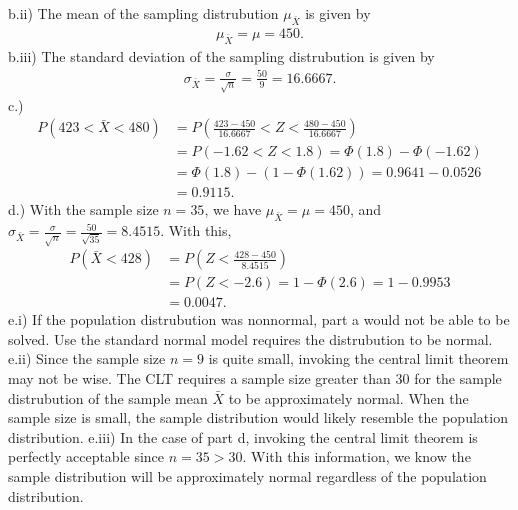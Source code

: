 \documentclass{report}
\begin{document}
\bigbreak \noindent 
b.ii) The mean of the sampling distrubution $\mu_{\bar{X}}$ is given by
\begin{align*}
    \mu_{\bar{X}} = \mu = 450
.\end{align*}
b.iii) The standard deviation of the sampling distrubution is given by
\begin{align*}
    \sigma_{\bar{X}} = \frac{\sigma}{\sqrt{n}} = \frac{50}{9} = 16.6667
.\end{align*}
\bigbreak \noindent 
c.) 
\begin{align*}
    P(423 < \bar{X} < 480) &= P\left(\frac{423-450}{16.6667} < Z < \frac{480 - 450}{16.6667}\right) \\
    &= P(-1.62 < Z < 1.8) = \Phi(1.8) - \Phi(-1.62) \\
    &= \Phi(1.8) - (1-\Phi(1.62)) = 0.9641 - 0.0526  \\
    &= 0.9115
.\end{align*}
\bigbreak \noindent 
d.) With the sample size $n=35$, we have $\mu_{\bar{X}} = \mu = 450$, and $\sigma_{\bar{X}} = \frac{\sigma}{\sqrt{n}} = \frac{50}{\sqrt{35}} = 8.4515$. With this, 
\begin{align*}
    P(\bar{X} < 428) &= P\left(Z < \frac{428 - 450}{8.4515}\right)  \\
                     &=  P(Z < -2.6)  = 1-\Phi(2.6) = 1-0.9953 \\
                     &=0.0047
.\end{align*}
\bigbreak \noindent 
e.i) If the population distrubution was nonnormal, part a would not be able to be solved. Use the standard normal model requires the distrubution to be normal.
\bigbreak \noindent 
e.ii) Since the sample size $n=9$ is quite small, invoking the central limit theorem may not be wise. The CLT requires a sample size greater than 30 for the sample distrubution of the sample mean $\bar{X}$ to be approximately normal. When the sample size is small, the sample distribution would likely resemble the population distribution.
\bigbreak \noindent 
e.iii) In the case of part d, invoking the central limit theorem is perfectly acceptable since $n = 35 > 30$. With this information, we know the sample distribution will be approximately normal regardless of the population distribution.
\end{document}
